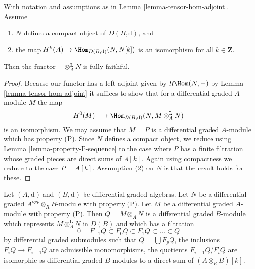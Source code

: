 \begin{lemma}
\label{lemma-tensor-with-compact-fully-faithful}
With notation and assumptions as in Lemma \ref{lemma-tensor-hom-adjoint}.
Assume
\begin{enumerate}
\item $N$ defines a compact object of $D(B, \text{d})$, and
\item the map $H^k(A) \to \Hom_{D(B, \text{d})}(N, N[k])$ is an
isomorphism for all $k \in \mathbf{Z}$.
\end{enumerate}
Then the functor $-\otimes_A^\mathbf{L} N$ is fully faithful.
\end{lemma}

\begin{proof}
Because our functor has a left adjoint given by
$R\Hom(N, -)$ by Lemma \ref{lemma-tensor-hom-adjoint}
it suffices to show that for a differential graded $A$-module $M$
the map
$$
H^0(M) \longrightarrow
\Hom_{D(B, \text{d})}(N, M \otimes_A^\mathbf{L} N)
$$
is an isomorphism. We may assume that $M = P$ is a differential graded
$A$-module which has property (P). Since $N$ defines a
compact object, we reduce using
Lemma \ref{lemma-property-P-sequence}
to the case where $P$ has a finite filtration whose graded pieces
are direct sums of $A[k]$. Again using compactness we reduce
to the case $P = A[k]$. Assumption (2) on $N$ is that
the result holds for these.
\end{proof}

\begin{lemma}
\label{lemma-P-not-preserved-base-change}
Let $(A, \text{d})$ and $(B, \text{d})$ be differential graded algebras.
Let $N$ be a differential graded $A^{opp} \otimes_R B$-module with property
(P). Let $M$ be a differential graded $A$-module with property (P).
Then $Q = M \otimes_A N$ is a differential graded $B$-module which represents
$M \otimes_A^\mathbf{L} N$ in $D(B)$ and which has a filtration
$$
0 = F_{-1}Q \subset F_0Q \subset F_1Q \subset \ldots \subset Q
$$
by differential graded submodules such that $Q = \bigcup F_pQ$,
the inclusions $F_iQ \to F_{i + 1}Q$ are admissible monomorphisms,
the quotients $F_{i + 1}Q/F_iQ$ are isomorphic as differential
graded $B$-modules to a direct sum of $(A \otimes_R B)[k]$.
\end{lemma}

